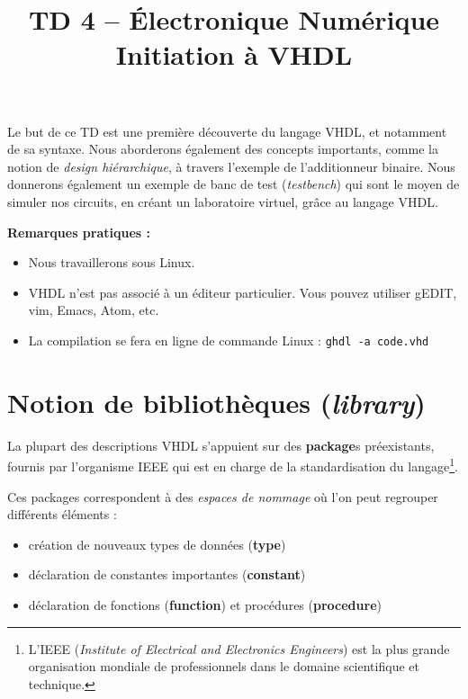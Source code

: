 \documentclass[a4paper,11pt]{article}
\title{\textcolor{primary}{\Huge\bfseries TD 4 -- Électronique Numérique}\\[0.5em] \Large Initiation à VHDL}
\author{}
\date{}
\begin{document}
\maketitle
\thispagestyle{fancy}   %
\vspace{-2em}

\begin{notebox}
Le but de ce TD est une première découverte du langage VHDL, et notamment de sa syntaxe. Nous aborderons également des concepts importants, comme la notion de \textit{design hiérarchique}, à travers l'exemple de l'additionneur binaire. Nous donnerons également un exemple de banc de test (\textit{testbench}) qui sont le moyen de simuler nos circuits, en créant un laboratoire virtuel, grâce au langage VHDL.

\vspace{0.5em}
\textbf{Remarques pratiques :}
\begin{itemize}
    \item Nous travaillerons sous Linux.
    \item VHDL n'est pas associé à un éditeur particulier. Vous pouvez utiliser gEDIT, vim, Emacs, Atom, etc.
    \item La compilation se fera en ligne de commande Linux : \texttt{ghdl -a code.vhd}
\end{itemize}
\end{notebox}

\vspace{1em}

\section{Notion de bibliothèques (\textit{library})}

La plupart des descriptions VHDL s'appuient sur des \textbf{package}s préexistants, fournis par l'organisme IEEE qui est en charge de la standardisation du langage\footnote{L'IEEE (\textit{Institute of Electrical and Electronics Engineers}) est la plus grande organisation mondiale de professionnels dans le domaine scientifique et technique.}.

Ces packages correspondent à des \textit{espaces de nommage} où l'on peut regrouper différents éléments :
\begin{itemize}
    \item création de nouveaux types de données (\textbf{type})
    \item déclaration de constantes importantes (\textbf{constant})
    \item déclaration de fonctions (\textbf{function}) et procédures (\textbf{procedure})
\end{itemize}
\end{document}
